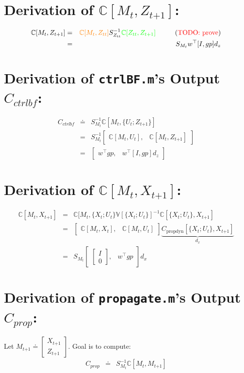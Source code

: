 \documentclass[9pt]{article}
\newcommand{\V}{{\mathbb V}}
\newcommand{\Cov}{{\mathbb C}}
\newcommand{\now}[1]{#1_t}                  %
\newcommand{\new}[1]{#1_{t\mathord{+}1}}    %
\newcommand{\pno}[1]{#1_{t}}  %
\newcommand{\uno}[1]{#1_{tt}}              %
\newcommand{\pne}[1]{#1_{t\mathord{+}1}}   %
\newcommand{\inv}{^{-1}}
\newcommand{\nnn}{\nonumber \\}
\newcommand{\nn}{\nonumber}
\newcommand{\red}[1]{\textcolor{red}{#1}}
\newcommand{\orange}[1]{\textcolor{orange}{#1}}
\newcommand{\green}[1]{\textcolor{green}{#1}}
\begin{document}
\section{Derivation of $\Cov[\pno{M},\pne{Z}]$:} %
\begin{eqnarray}
\Cov[\now{M},\pne{Z}]
&=& \orange{\Cov[\pno{M},\uno{Z}]} S_{\uno{Z}}\inv \green{\Cov[\uno{Z},\pne{Z}]} \text{\hspace{1.0cm}(\red{TODO: prove})} \nnn
&=& S_{\now{M}} w^\top [ I , gp ] d_z \label{eq:cov-m-zpne}
\end{eqnarray}

\section{Derivation of \texttt{ctrlBF.m}'s Output $C_{ctrlbf}$:}
\begin{eqnarray}
C_{ctrlbf}
&\doteq& S_{\now{M}}\inv \Cov[\now{M},\{\now{U};\pne{Z}\}] \nnn
&=& S_{\now{M}}\inv \begin{bmatrix} \Cov[\now{M},\now{U}], & \Cov[\now{M},\pne{Z}] \end{bmatrix} \nnn
&=& \begin{bmatrix} w^\top gp, & w^\top [ I , gp ] d_z \end{bmatrix}
\end{eqnarray}

\section{Derivation of $\Cov[\pno{M},\new{X}]$:}
\begin{eqnarray}
 \Cov[\now{M},\new{X}]
 &=& \Cov[\now{M},\{\now{X};\now{U}\}\V[\{\now{X};\now{U}\}]\inv \Cov[\{\now{X};\now{U}\},\new{X}] \nnn
 &=& \begin{bmatrix} \Cov[\now{M},\now{X}], & \Cov[\now{M},\now{U}] \end{bmatrix} \underbrace{C_{\text{propdyn}}[\{\now{X};\now{U}\},\new{X}]}_{d_x} \nnn
 &=& S_{\now{M}} \begin{bmatrix} \begin{bmatrix} I \\ 0 \end{bmatrix}, & w^\top gp \end{bmatrix} d_x \label{eq:cov-m-xnew}
\end{eqnarray}

\section{Derivation of \texttt{propagate.m}'s Output $C_{prop}$:} \label{app:cprop2}
Let $\new{M} \doteq \left[\!\begin{array}{c}\new{X}\\\pne{Z}\!\end{array}\right]$.
Goal is to compute:
\begin{eqnarray}
C_{prop} &\doteq& S_{\now{M}}\inv \Cov[\now{M}, \new{M}] \nn
\end{eqnarray}
\end{document}
